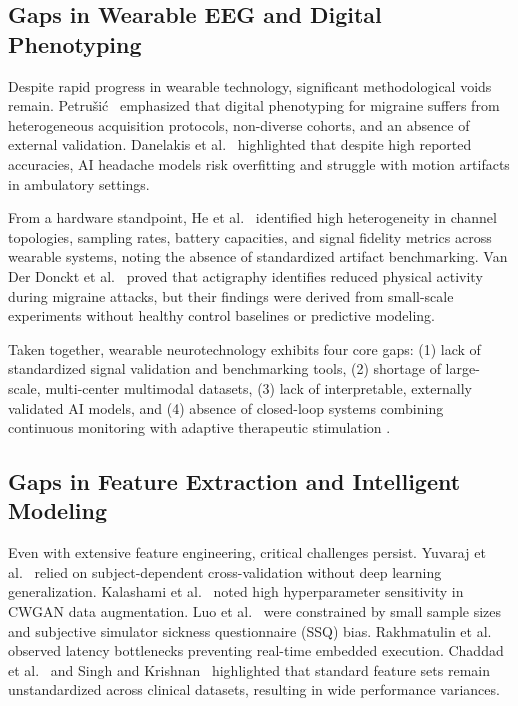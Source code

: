 \documentclass[12pt, a4paper]{report}
\begin{document}
\subsection{Gaps in Wearable EEG and Digital Phenotyping}
Despite rapid progress in wearable technology, significant methodological voids remain. Petru\v{s}i\'{c}~\cite{Petrusic2025} emphasized that digital phenotyping for migraine suffers from heterogeneous acquisition protocols, non-diverse cohorts, and an absence of external validation. Danelakis et al.~\cite{DanelakisStubberud2025} highlighted that despite high reported accuracies, AI headache models risk overfitting and struggle with motion artifacts in ambulatory settings.

From a hardware standpoint, He et al.~\cite{He2023} identified high heterogeneity in channel topologies, sampling rates, battery capacities, and signal fidelity metrics across wearable systems, noting the absence of standardized artifact benchmarking. Van Der Donckt et al.~\cite{VanDerDonckt2025} proved that actigraphy identifies reduced physical activity during migraine attacks, but their findings were derived from small-scale experiments without healthy control baselines or predictive modeling.

Taken together, wearable neurotechnology exhibits four core gaps: (1) lack of standardized signal validation and benchmarking tools, (2) shortage of large-scale, multi-center multimodal datasets, (3) lack of interpretable, externally validated AI models, and (4) absence of closed-loop systems combining continuous monitoring with adaptive therapeutic stimulation \cite{Petrusic2025,He2023,DanelakisStubberud2025}.

\subsection{Gaps in Feature Extraction and Intelligent Modeling}
Even with extensive feature engineering, critical challenges persist. Yuvaraj et al.~\cite{Yuvaraj2023} relied on subject-dependent cross-validation without deep learning generalization. Kalashami et al.~\cite{Kalashami2022} noted high hyperparameter sensitivity in CWGAN data augmentation. Luo et al.~\cite{Luo2024} were constrained by small sample sizes and subjective simulator sickness questionnaire (SSQ) bias. Rakhmatulin et al.~\cite{Rakhmatulin2024} observed latency bottlenecks preventing real-time embedded execution. Chaddad et al.~\cite{Chaddad2023} and Singh and Krishnan~\cite{Singh2023} highlighted that standard feature sets remain unstandardized across clinical datasets, resulting in wide performance variances.
\end{document}
